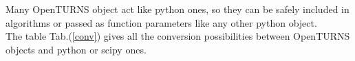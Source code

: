 \renewcommand{\filename}{docUC_Intro_PythonStandards}
\renewcommand{\filetitle}{Link with other python standards}

\HeaderNNIILevel

Many OpenTURNS object act like python ones, so they can be safely included in algorithms or passed as function parameters like any other python object.\\
The table Tab.(\ref{conv}) gives all the conversion possibilities between OpenTURNS objects and python or scipy ones.

